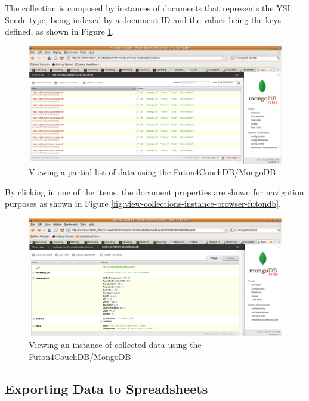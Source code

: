 The collection is composed by instances of documents that represents the YSI
Sonde type, being indexed by a document ID and the values being the keys
defined, as shown in Figure \ref{fig:view-collected-data-list-browser-futondb}.

\begin{figure}[!h]
  \centering
  \includegraphics[scale=0.65]{../diagrams/view-collected-data-list-browser-futondb}
  \caption{Viewing a partial list of data using the Futon4CouchDB/MongoDB}
  \label{fig:view-collected-data-list-browser-futondb}
\end{figure}

By clicking in one of the items, the document properties are shown for
navigation purposes as shown in Figure
\ref{fig:view-collections-instance-browser-futondb}.

\begin{figure}[!h]
  \centering
  \includegraphics[scale=0.6]{../diagrams/view-collected-data-instance-browser-futondb}
  \caption{Viewing an instance of collected data using the Futon4CouchDB/MongoDB}
  \label{fig:view-collected-data-instance-browser-futondb}
\end{figure}

\newpage

\subsection{Exporting Data to Spreadsheets}

